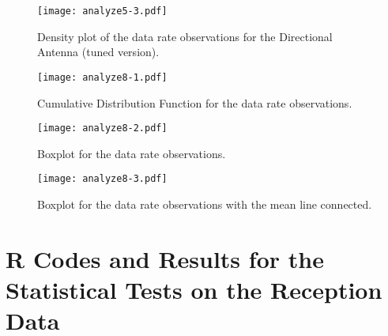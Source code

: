 \begin{figure}[!htbp]
 \begin{center}
  \texttt{[image: analyze5-3.pdf]}
 \end{center}
 \caption{Density plot of the data rate observations for the Directional Antenna (tuned version).}
  \label{fig:cf53}
\end{figure}

\newpage



\begin{figure}[!htbp]
 \begin{center}
  \texttt{[image: analyze8-1.pdf]}
 \end{center}
 \caption{Cumulative Distribution Function for the data rate observations.}
  \label{fig:cf81}
\end{figure}

\begin{figure}[!htbp]
 \begin{center}
  \texttt{[image: analyze8-2.pdf]}
 \end{center}
 \caption{Boxplot for the data rate observations.}
  \label{fig:cf82}
\end{figure}

\begin{figure}[!htbp]
 \begin{center}
  \texttt{[image: analyze8-3.pdf]}
 \end{center}
 \caption{Boxplot for the data rate observations with the mean line connected.}
  \label{fig:cf83}
\end{figure}

\newpage

\section{R Codes and Results for the Statistical Tests on the Reception Data}\label{rreception}
\begin{Shaded}
\begin{Highlighting}[]
 \NormalTok{)}
\end{Highlighting}
\end{Shaded}

